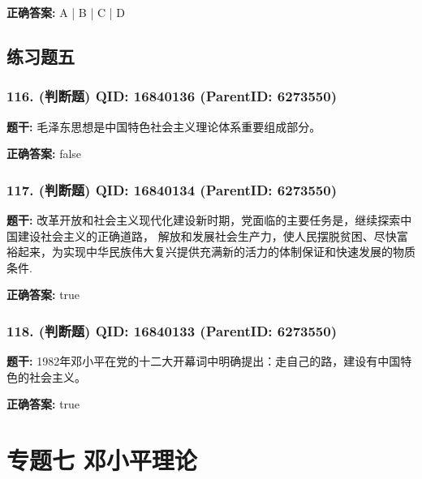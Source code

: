 \documentclass[12pt,UTF8]{ctexart}
\begin{document}
\textbf{正确答案:}
A | B | C | D

\vspace{0.3em}\hrulefill\vspace{0.7em}

\subsection*{练习题五}

\subsubsection*{116. (判断题) \small QID: 16840136 (ParentID: 6273550)}

\textbf{题干:}
毛泽东思想是中国特色社会主义理论体系重要组成部分。



\textbf{正确答案:}
false

\vspace{0.3em}\hrulefill\vspace{0.7em}

\subsubsection*{117. (判断题) \small QID: 16840134 (ParentID: 6273550)}

\textbf{题干:}
改革开放和社会主义现代化建设新时期，党面临的主要任务是，继续探索中国建设社会主义的正确道路， 解放和发展社会生产力，使人民摆脱贫困、尽快富裕起来，为实现中华民族伟大复兴提供充满新的活力的体制保证和快速发展的物质条件.



\textbf{正确答案:}
true

\vspace{0.3em}\hrulefill\vspace{0.7em}

\subsubsection*{118. (判断题) \small QID: 16840133 (ParentID: 6273550)}

\textbf{题干:}
1982年邓小平在党的十二大开幕词中明确提出：走自己的路，建设有中国特色的社会主义。



\textbf{正确答案:}
true

\vspace{0.3em}\hrulefill\vspace{0.7em}

\section*{专题七 邓小平理论}
\hrulefill
\end{document}
